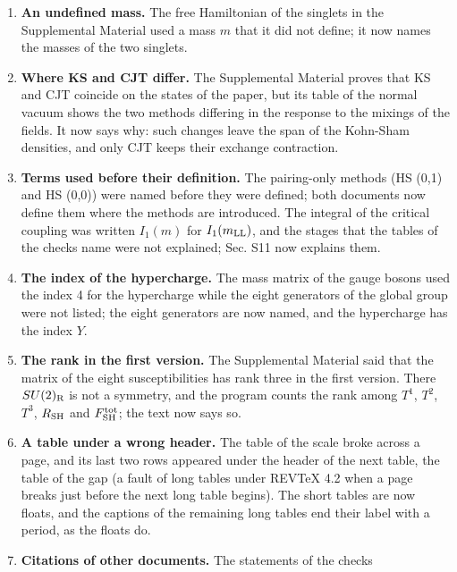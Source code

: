 \documentclass[
  10pt,
]{article}
\begin{document}
\begin{enumerate}
  Material first printed the symbols of the manuscripts (with the suffix
  SH where the article has none); the build now maps them to the symbols
  of the article, and the symbol table of the Supplemental Material
  gained the two potentials \(V^{(0)}\) and \(V^{(1)}\) that its tables
  use.
\item
  \textbf{An undefined mass.} The free Hamiltonian of the singlets in
  the Supplemental Material used a mass \(m\) that it did not define; it
  now names the masses of the two singlets.
\item
  \textbf{Where KS and CJT differ.} The Supplemental Material proves
  that KS and CJT coincide on the states of the paper, but its table of
  the normal vacuum shows the two methods differing in the response to
  the mixings of the fields. It now says why: such changes leave the
  span of the Kohn-Sham densities, and only CJT keeps their exchange
  contraction.
\item
  \textbf{Terms used before their definition.} The pairing-only methods
  (HS (0,1) and HS (0,0)) were named before they were defined; both
  documents now define them where the methods are introduced. The
  integral of the critical coupling was written \(I_1(m)\) for
  \(I_1(m_{\rm LL})\), and the stages that the tables of the checks name
  were not explained; Sec. S11 now explains them.
\item
  \textbf{The index of the hypercharge.} The mass matrix of the gauge
  bosons used the index 4 for the hypercharge while the eight generators
  of the global group were not listed; the eight generators are now
  named, and the hypercharge has the index \(Y\).
\item
  \textbf{The rank in the first version.} The Supplemental Material said
  that the matrix of the eight susceptibilities has rank three in the
  first version. There \(SU(2)_{\rm R}\) is not a symmetry, and the
  program counts the rank among \(T^1\), \(T^2\), \(T^3\),
  \(R_{\rm SH}\) and \(F^{\rm tot}_{\rm SH}\); the text now says so.
\item
  \textbf{A table under a wrong header.} The table of the scale broke
  across a page, and its last two rows appeared under the header of the
  next table, the table of the gap (a fault of long tables under REVTeX
  4.2 when a page breaks just before the next long table begins). The
  short tables are now floats, and the captions of the remaining long
  tables end their label with a period, as the floats do.
\item
  \textbf{Citations of other documents.} The statements of the checks

\end{enumerate}
\end{document}
